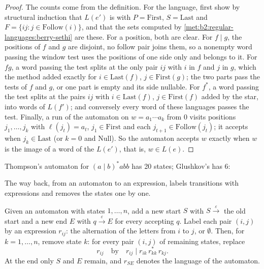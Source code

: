 \begin{proof}
The counts come from the definition. For the language, first show by structural induction that $L(e')$ is  with
$P = \mathrm{First}$, $S = \mathrm{Last}$ and $F = \{ij : j \in \mathrm{Follow}(i)\}$, and that the sets computed by
\cref{met:b2:regular-languages:berry-sethi} are these. For a position, both are clear. For $f \mid g$, the positions of
$f$ and $g$ are disjoint, no follow pair joins them, so a nonempty word passing the window test uses the positions of
one side only and belongs to it. For $fg$, a word passing the test splits at the only pair $ij$ with $i$ in $f$ and $j$
in $g$, which the method added exactly for $i \in \mathrm{Last}(f)$, $j \in \mathrm{First}(g)$; the two parts pass the
tests of $f$ and $g$, or one part is empty and its side nullable. For $f^*$, a word passing the test splits at the
pairs $ij$ with $i \in \mathrm{Last}(f)$, $j \in \mathrm{First}(f)$ added by the star, into words of $L(f')$; and
conversely every word of these languages passes the test. Finally, a run of the automaton on $w = a_1 \cdots a_k$
from 0 visits positions $j_1, \dots, j_k$ with $\ell(j_t) = a_t$, $j_1 \in \mathrm{First}$ and each $j_{t+1} \in
\mathrm{Follow}(j_t)$; it accepts when $j_k \in \mathrm{Last}$ (or $k = 0$ and $\mathrm{Null}$). So the automaton
accepts $w$ exactly when $w$ is the image of a word of the  $L(e')$, that is, $w \in L(e)$.
\end{proof}

Thompson's automaton for $(a \mid b)^*abb$ has 20 states; Glushkov's has 6:

\label{out:b2:regular-languages:thompson}

The way back, from an automaton to an expression, labels transitions with expressions and removes the states one by
one.

\begin{method}\label{met:b2:regular-languages:elimination}
Given an automaton with states $1, \dots, n$, add a new start $S$ with $S \xrightarrow{\varepsilon}$ the old start and
a new end $E$ with $q \xrightarrow{\varepsilon} E$ for every accepting $q$. Label each pair $(i, j)$ by an expression
$r_{ij}$: the alternation of the letters from $i$ to $j$, or $\emptyset$. Then, for $k = 1, \dots, n$, remove state
$k$: for every pair $(i, j)$ of remaining states, replace
\[
r_{ij} \quad\text{by}\quad r_{ij} \mid r_{ik}\, r_{kk}^*\, r_{kj}.
\]
At the end only $S$ and $E$ remain, and $r_{SE}$ denotes the language of the automaton.
\end{method}

